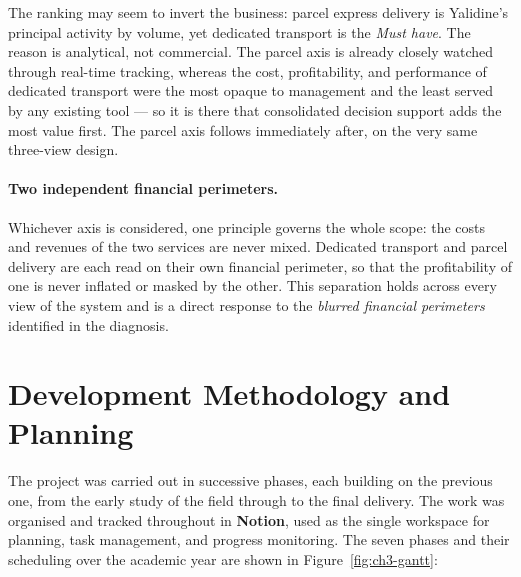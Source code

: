 The ranking may seem to invert the business: parcel express delivery is Yalidine's principal activity
by volume, yet dedicated transport is the \emph{Must have}. The reason is analytical, not commercial.
The parcel axis is already closely watched through real-time tracking, whereas the cost, profitability,
and performance of dedicated transport were the most opaque to management and the least served by any
existing tool --- so it is there that consolidated decision support adds the most value first. The
parcel axis follows immediately after, on the very same three-view design.

\paragraph{Two independent financial perimeters.}
Whichever axis is considered, one principle governs the whole scope: the costs and revenues of the two
services are never mixed. Dedicated transport and parcel delivery are each read on their own financial
perimeter, so that the profitability of one is never inflated or masked by the other. This separation
holds across every view of the system and is a direct response to the \emph{blurred financial
perimeters} identified in the diagnosis.


\section{Development Methodology and Planning}
\label{sec:ch3-methodology}

The project was carried out in successive phases, each building on the previous one, from the early
study of the field through to the final delivery. The work was organised and tracked throughout in
\textbf{Notion}, used as the single workspace for planning, task management, and progress monitoring.
The seven phases and their scheduling over the academic year are shown in
Figure~\ref{fig:ch3-gantt}:

